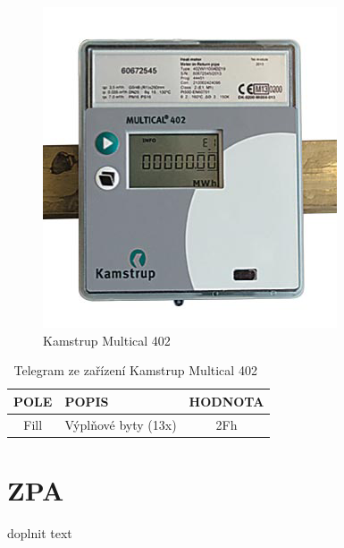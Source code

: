 	 \begin{figure}[!ht]
  \begin{center}
    \includegraphics[scale=0.7]{obrazky/zarizeni_kamstrup}
  \end{center}
  \caption{Kamstrup Multical 402~\cite{CidloKamstrup}}
\end{figure}

\begin{table}[!ht]
\centering
\caption{Telegram ze zařízení Kamstrup Multical 402~\cite{CidloKamstrup}}
\label{TabulkaTelegramKamstrup}
\begin{tabular}{|c|l|c|}
\hline
\textbf{POLE}      & \textbf{POPIS}            & \textbf{HODNOTA} \\ \hline
Fill               & Výplňové byty (13x)                                 & 2Fh              \\ \hline

\end{tabular}%
\end{table}

	
	
	\section{ZPA}

\colorbox[rgb]{1,0,0}{doplnit text}

